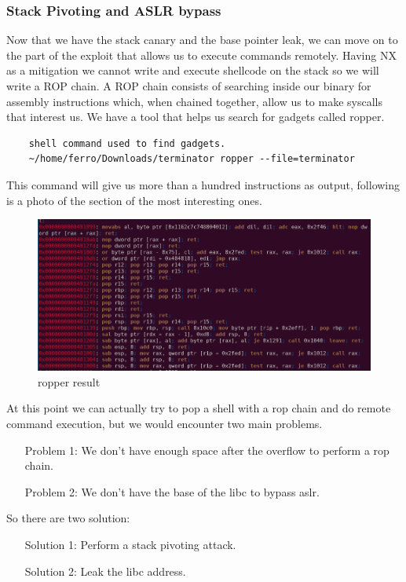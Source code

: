     \subsubsection{Stack Pivoting and ASLR bypass}
    Now that we have the stack canary and the base pointer leak, we can move on to the part of the exploit that allows us to execute commands remotely.\newline
    Having NX as a mitigation we cannot write and execute shellcode on the stack so we will write a ROP chain.
    A ROP chain consists of searching inside our binary for assembly instructions which, when chained together, allow us to make syscalls that interest us.\newline
    \clearpage
    We have a tool that helps us search for gadgets called ropper.\newline
    \begin{verbatim}
    shell command used to find gadgets.
    ~/home/ferro/Downloads/terminator ropper --file=terminator
    \end{verbatim}
    This command will give us more than a hundred instructions as output, following is a photo of the section of the most interesting ones.\newline
    \begin{figure}[h]
        \centering
        \includegraphics[width=1.2\linewidth]{Images/rop_gadget.png}
        \caption{ropper result}
        \label{fig:ropper}
    \end{figure}
    
    At this point we can actually try to pop a shell with a rop chain and do remote command execution, but we would encounter two main problems.\newline
    \begin{itemize}
        \item[Problem 1:] We don't have enough space after the overflow to perform a rop chain.
        \item[Problem 2:] We don't have the base of the libc to bypass aslr.
    \end{itemize}
    So there are two solution: \newline
    \begin{itemize}
        \item[Solution 1:] Perform a stack pivoting attack.
        \item[Solution 2:] Leak  the libc address.
    \end{itemize}
    \clearpage
